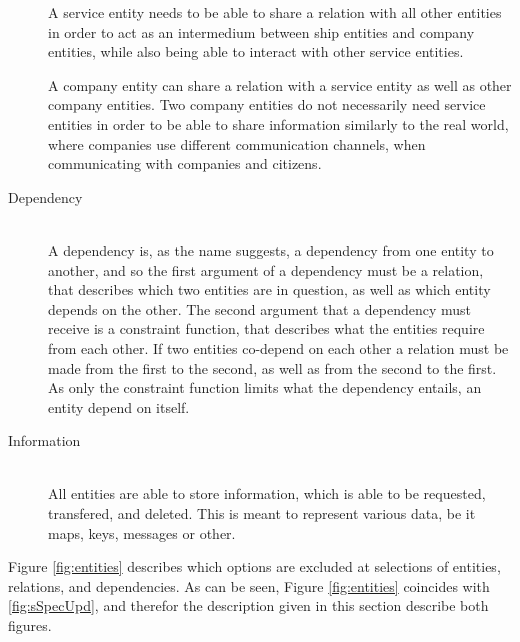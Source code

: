 \begin{description}
		A service entity needs to be able to share a relation with all other entities in order to act as an intermedium between ship entities and company entities, while also being able to interact with other service entities.

		A company entity can share a relation with a service entity as well as other company entities. Two company entities do not necessarily need service entities in order to be able to share information similarly to the real world, where companies use different communication channels, when communicating with companies and citizens.
	\item[Dependency]\ \\
		A dependency is, as the name suggests, a dependency from one entity to another, and so the first argument of a dependency must be a relation, that describes which two entities are in question, as well as which entity depends on the other. The second argument that a dependency must receive is a constraint function, that describes what the entities require from each other. If two entities co-depend on each other a relation must be made from the first to the second, as well as from the second to the first. As only the constraint function limits what the dependency entails, an entity  depend on itself.
	\item[Information]\ \\
		All entities are able to store information, which is able to be requested, transfered, and deleted. This is meant to represent various data, be it maps, keys, messages or other.
\end{description}
\noindent
Figure \ref{fig:entities} describes which options are excluded at selections of entities, relations, and dependencies. As can be seen, Figure \ref{fig:entities} coincides with \ref{fig:sSpecUpd}, and therefor the description given in this section describe both figures. 

